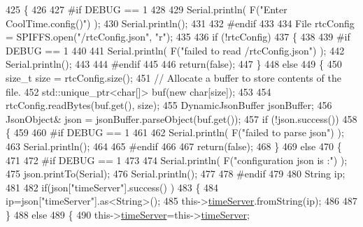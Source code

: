\begin{DoxyCode}
425 \{
426 
427 \textcolor{preprocessor}{#if DEBUG == 1 }
428 
429     Serial.println( F(\textcolor{stringliteral}{"Enter CoolTime.config()"}) );
430     Serial.println();
431 
432 \textcolor{preprocessor}{#endif }
433 
434     File rtcConfig = SPIFFS.open(\textcolor{stringliteral}{"/rtcConfig.json"}, \textcolor{stringliteral}{"r"});
435 
436     \textcolor{keywordflow}{if} (!rtcConfig) 
437     \{
438     
439 \textcolor{preprocessor}{    #if DEBUG == 1 }
440 
441         Serial.println( F(\textcolor{stringliteral}{"failed to read /rtcConfig.json"}) );
442         Serial.println();
443     
444 \textcolor{preprocessor}{    #endif}
445 
446         \textcolor{keywordflow}{return}(\textcolor{keyword}{false});
447     \}
448     \textcolor{keywordflow}{else}
449     \{
450         \textcolor{keywordtype}{size\_t} size = rtcConfig.size();
451         \textcolor{comment}{// Allocate a buffer to store contents of the file.}
452         std::unique\_ptr<char[]> buf(\textcolor{keyword}{new} \textcolor{keywordtype}{char}[size]);
453 
454         rtcConfig.readBytes(buf.get(), size);
455         DynamicJsonBuffer jsonBuffer;
456         JsonObject& json = jsonBuffer.parseObject(buf.get());
457         \textcolor{keywordflow}{if} (!json.success()) 
458         \{
459         
460 \textcolor{preprocessor}{        #if DEBUG == 1 }
461 
462             Serial.println( F(\textcolor{stringliteral}{"failed to parse json"}) );
463             Serial.println();
464         
465 \textcolor{preprocessor}{        #endif }
466 
467             \textcolor{keywordflow}{return}(\textcolor{keyword}{false});
468         \} 
469         \textcolor{keywordflow}{else}
470         \{  
471         
472 \textcolor{preprocessor}{        #if DEBUG == 1 }
473 
474             Serial.println( F(\textcolor{stringliteral}{"configuration json is :"}) );
475             json.printTo(Serial);
476             Serial.println();
477 
478 \textcolor{preprocessor}{        #endif}
479 
480             String ip;
481             
482             \textcolor{keywordflow}{if}(json[\textcolor{stringliteral}{"timeServer"}].success() )
483             \{           
484                  ip=json[\textcolor{stringliteral}{"timeServer"}].as<String>();
485                 this->\hyperlink{classCoolTime_ad2b9858f399108cb440dd1e908916f04}{timeServer}.fromString(ip);
486                 
487             \}
488             \textcolor{keywordflow}{else}
489             \{
490                 this->\hyperlink{classCoolTime_ad2b9858f399108cb440dd1e908916f04}{timeServer}=this->\hyperlink{classCoolTime_ad2b9858f399108cb440dd1e908916f04}{timeServer};

\end{DoxyCode}
